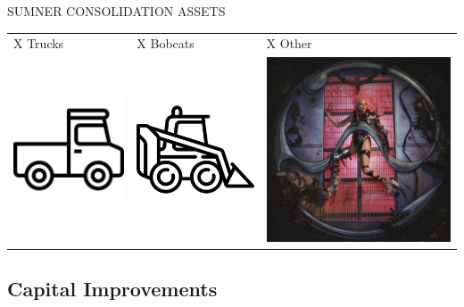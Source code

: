 \textcolor{ccorange}{SUMNER CONSOLIDATION ASSETS}
\begin{table}[H]
\begin{tabular}{m{}m{}m{}}
{\color{ccorange} X Trucks} & {\color{ccorange} X Bobcats} & {\color{ccorange} X Other} \\
\includegraphics[width=.25\columnwidth]{truck.png}                            & \includegraphics[width=.25\columnwidth]{bobcat.png}                             & \includegraphics[width=.25\columnwidth]{chromatica.jpg}                          
\end{tabular}
\end{table}
\pagebreak
\textcolor{ccorange}{\section{Capital Improvements}}


